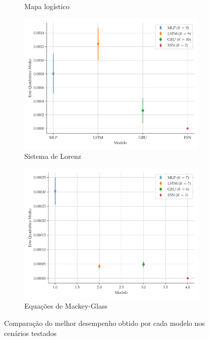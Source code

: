 \documentclass{article}
\begin{document}
\begin{figure}[!h]
\begin{subfigure}[t]{0.2\textwidth}
         \caption{Mapa logístico}
     \end{subfigure}
     \centering
     \begin{subfigure}[t]{0.2\textwidth}
         \includegraphics[scale=0.2]{comparacao-k-lorenz.pdf}
         \caption{Sistema de Lorenz}
     \end{subfigure}
     \centering
     \begin{subfigure}[t]{0.2\textwidth} 
         \includegraphics[scale=0.2]{comparacao-mackeyglass.pdf}
         \caption{Equações de Mackey-Glass}
     \end{subfigure}  
     \centering   
     \caption{Comparação do melhor desempenho obtido por cada modelo nos cenários testados}
     \label{fig:model-comparison}
\end{figure}
\end{document}
